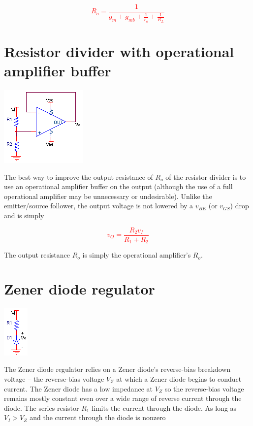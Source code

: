 \textcolor{red}{
\begin{equation}
R_{o} = \frac{1}{g_m + g_{mb}+\frac{1}{r_o}+\frac{1}{R_{L}}}
\end{equation}
}

\section{Resistor divider with operational amplifier buffer}
\begin{center}
	\includegraphics{schematics/resistordivider_opampbuffer.PNG}
\end{center}
The best way to improve the output resistance of $R_{o}$ of the resistor divider is to use an operational amplifier buffer on the output (although the use of a full operational amplifier may be unnecessary or undesirable).
Unlike the emitter/source follower, the output voltage is not lowered by a $v_{BE}$ (or $v_{GS}$) drop and is simply

\textcolor{red}{
\begin{equation}
v_{O} = \frac{R_2 v_{I}}{R_1 + R_2}
\end{equation}
}

The output resistance $R_{o}$ is simply the operational amplifier's $R_{o}$.

\section{Zener diode regulator}
\begin{center}
	\includegraphics{schematics/zenerdiode_regulator.PNG}
\end{center}

The Zener diode regulator relies on a Zener diode's reverse-bias breakdown voltage -- the reverse-bias voltage $V_{Z}$ at which a Zener diode begins to conduct current.
The Zener diode has a low impedance at $V_{Z}$ so the reverse-bias voltage remains mostly constant even over a wide range of reverse current through the diode.
The series resistor $R_1$ limits the current through the diode.
As long as $V_{I} > V_{Z}$ and the current through the diode is nonzero

